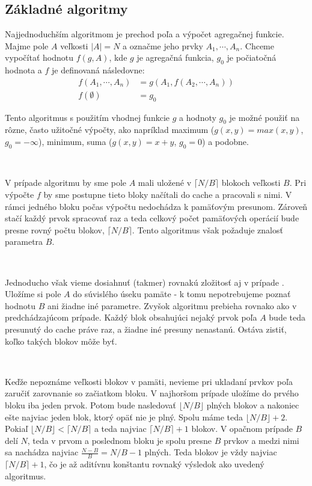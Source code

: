 \subsection{Základné algoritmy}

Najjednoduchším \obliv algoritmom je prechod poľa a výpočet agregačnej funkcie. Majme pole $A$ veľkosti $|A| = N$ a označme jeho prvky $A_1,\cdots,A_n$. Chceme vypočítať hodnotu $f(g, A)$, kde $g$ je agregačná funkcia, $g_0$ je počiatočná hodnota a $f$ je definovaná následovne:
\[
\begin{aligned}
f(A_1,\cdots,A_n) &= g(A_1, f(A_2,\cdots,A_n)) \\
f(\emptyset) &= g_0
\end{aligned}
\]

Tento algoritmus s použitím vhodnej funkcie $g$ a hodnoty $g_0$ je možné použiť na rôzne, často užitočné výpočty, ako napríklad maximum ($g(x, y) = max(x, y)$, $g_0 = -\infty$), minimum, suma ($g(x,y) = x+y$, $g_0 = 0$) a podobne.

\

V prípade \aware algoritmu by sme pole $A$ mali uložené v $\lceil N/B \rceil$ blokoch veľkosti $B$. Pri výpočte $f$ by sme postupne tieto bloky načítali do cache a pracovali s nimi. V rámci jedného bloku počas výpočtu nedochádza k pamäťovým presunom. Zároveň stačí každý prvok spracovať raz a teda celkový počet pamäťových operácií bude presne rovný počtu blokov, $\lceil N/B \rceil$. Tento algoritmus však požaduje znalosť parametra $B$.

\

Jednoducho však vieme dosiahnuť (takmer) rovnakú zložitosť aj v prípade \obliv. Uložíme si pole $A$ do súvislého úseku pamäte - k tomu nepotrebujeme poznať hodnotu $B$ ani žiadne iné parametre. Zvyšok algoritmu prebieha rovnako ako v predchádzajúcom prípade. Každý blok obsahujúci nejaký prvok poľa $A$ bude teda presunutý do cache práve raz, a žiadne iné presuny nenastanú. Ostáva zistiť, koľko takých blokov môže byť.

\

Keďže nepoznáme veľkosti blokov v pamäti, nevieme pri ukladaní prvkov poľa zaručiť zarovnanie so začiatkom bloku. V najhoršom prípade uložíme do prvého bloku iba jeden prvok. Potom bude nasledovať $\lfloor N/B \rfloor$ plných blokov a nakoniec ešte najviac jeden blok, ktorý opäť nie je plný. Spolu máme teda $\lfloor N/B \rfloor + 2$. Pokiaľ $\lfloor N/B \rfloor < \lceil N/B \rceil$ a teda najviac $\lceil N/B \rceil + 1$ blokov. V opačnom prípade $B$ delí $N$, teda v prvom a poslednom bloku je spolu presne $B$ prvkov a medzi nimi sa nachádza najviac $\frac{N-B}{B} = N/B - 1$ plných. Teda blokov je vždy najviac $\lceil N/B \rceil +1$, čo je až aditívnu konštantu rovnaký výsledok ako uvedený \aware algoritmus.

